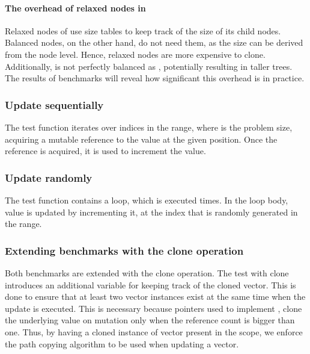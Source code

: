 \paragraph{The overhead of relaxed nodes in \rrbtree{}}
Relaxed nodes of \rrbtree{} use size tables to keep track of the size of its child nodes. Balanced nodes, on the other hand, do not need them, as the size can be derived from the node level. Hence, relaxed nodes are more expensive to clone. Additionally, \rrbtree{} is not perfectly balanced as \rbtree{}, potentially resulting in taller trees. The results of benchmarks will reveal how significant this overhead is in practice.

\subsubsection*{Update sequentially}
The test function iterates over indices in the \range{[0, N)} range, where \n{} is the problem size, acquiring a mutable reference to the value at the given position. Once the reference is acquired, it is used to increment the value.

\subsubsection*{Update randomly}
The test function contains a loop, which is executed \n{} times. In the loop body, value is updated by incrementing it, at the index that is randomly generated in the \range{[0, N)} range.

\subsubsection*{Extending benchmarks with the clone operation}
Both benchmarks are extended with the clone operation. The test with clone introduces an additional variable for keeping track of the cloned vector. This is done to ensure that at least two vector instances exist at the same time when the update is executed. This is necessary because \rc{} pointers used to implement \rbtree{}, clone the underlying value on mutation only when the reference count is bigger than one. Thus, by having a cloned instance of vector present in the scope, we enforce the path copying algorithm to be used when updating a vector.

